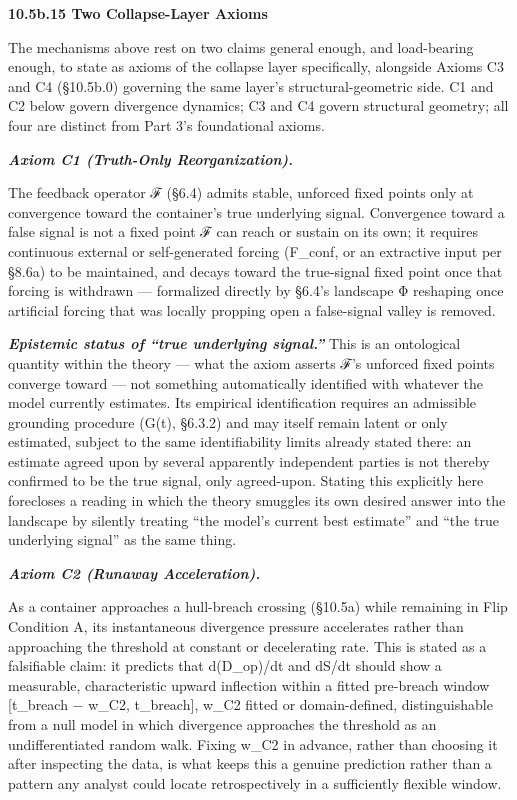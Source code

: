\documentclass[
]{article}
\begin{document}
\textbf{10.5b.15 Two Collapse-Layer Axioms}

The mechanisms above rest on two claims general enough, and load-bearing
enough, to state as axioms of the collapse layer specifically, alongside
Axioms C3 and C4 (§10.5b.0) governing the same layer's
structural-geometric side. C1 and C2 below govern divergence dynamics;
C3 and C4 govern structural geometry; all four are distinct from Part
3's foundational axioms.

\emph{\textbf{Axiom C1 (Truth-Only Reorganization).}}

The feedback operator ℱ (§6.4) admits stable, unforced fixed points only
at convergence toward the container's true underlying signal.
Convergence toward a false signal is not a fixed point ℱ can reach or
sustain on its own; it requires continuous external or self-generated
forcing (F\_conf, or an extractive input per §8.6a) to be maintained,
and decays toward the true-signal fixed point once that forcing is
withdrawn --- formalized directly by §6.4's landscape Φ reshaping once
artificial forcing that was locally propping open a false-signal valley
is removed.

\emph{\textbf{Epistemic status of ``true underlying signal.''}} This is
an ontological quantity within the theory --- what the axiom asserts ℱ's
unforced fixed points converge toward --- not something automatically
identified with whatever the model currently estimates. Its empirical
identification requires an admissible grounding procedure (G(t), §6.3.2)
and may itself remain latent or only estimated, subject to the same
identifiability limits already stated there: an estimate agreed upon by
several apparently independent parties is not thereby confirmed to be
the true signal, only agreed-upon. Stating this explicitly here
forecloses a reading in which the theory smuggles its own desired answer
into the landscape by silently treating ``the model's current best
estimate'' and ``the true underlying signal'' as the same thing.

\emph{\textbf{Axiom C2 (Runaway Acceleration).}}

As a container approaches a hull-breach crossing (§10.5a) while
remaining in Flip Condition A, its instantaneous divergence pressure
accelerates rather than approaching the threshold at constant or
decelerating rate. This is stated as a falsifiable claim: it predicts
that d(D\_op)/dt and dS/dt should show a measurable, characteristic
upward inflection within a fitted pre-breach window {[}t\_breach −
w\_C2, t\_breach{]}, w\_C2 fitted or domain-defined, distinguishable
from a null model in which divergence approaches the threshold as an
undifferentiated random walk. Fixing w\_C2 in advance, rather than
choosing it after inspecting the data, is what keeps this a genuine
prediction rather than a pattern any analyst could locate
retrospectively in a sufficiently flexible window.
\end{document}
